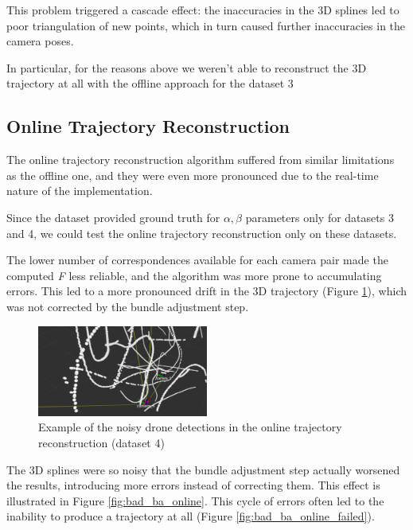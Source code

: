 \documentclass[11pt]{article}
\begin{document}
This problem triggered a cascade effect: the inaccuracies in the 3D splines led to poor triangulation of new points, which in turn caused further inaccuracies in the camera poses.

In particular, for the reasons above we weren't able to reconstruct the 3D trajectory at all with the offline approach for the dataset 3

\subsection{Online Trajectory Reconstruction}

The online trajectory reconstruction algorithm suffered from similar limitations as the offline one, and they were even more pronounced due to the real-time nature of the implementation.

Since the dataset provided ground truth for $\alpha,\beta$ parameters only for datasets 3 and 4, we could test the online trajectory reconstruction only on these datasets.

The lower number of correspondences available for each camera pair made the computed \textit{F} less reliable, and the algorithm was more prone to accumulating errors. This led to a more pronounced drift in the 3D trajectory (Figure \ref{fig:online_noisy_detections}), which was not corrected by the bundle adjustment step.

\begin{figure}[h]
    \centering
    \includegraphics[width=0.5\textwidth]{imgs/online_noisy_detections.png}
    \caption{Example of the noisy drone detections in the online trajectory reconstruction (dataset 4)}
    \label{fig:online_noisy_detections}
\end{figure}

The 3D splines were so noisy that the bundle adjustment step actually worsened the results, introducing more errors instead of correcting them. This effect is illustrated in Figure \ref{fig:bad_ba_online}. This cycle of errors often led to the inability to produce a trajectory at all (Figure \ref{fig:bad_ba_online_failed}).
\end{document}
